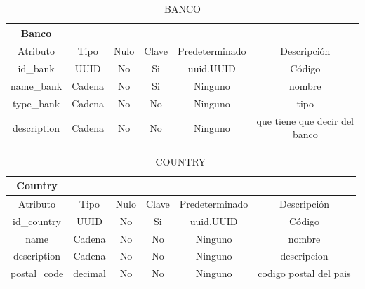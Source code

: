 \documentclass{article}
\begin{document}
\begin{table}[H]
    \centering
    \begin{tabular}{|c|c|c|c|c|c|}
    \hline
Banco	& & & & & \\		
\hline
Atributo&	Tipo&	Nulo&	Clave&	Predeterminado&	Descripción\\
\hline

id_bank&	UUID&	No&	Si&	uuid.UUID&	Código\\
\hline

name_bank&	Cadena&	No&	Si	&Ninguno	&nombre\\
\hline

type_bank	&Cadena&	No	&No	&Ninguno&	tipo\\
\hline

description&	Cadena	&No	&No&	Ninguno&	que tiene que decir del banco\\
\hline
    \end{tabular}
    \caption{BANCO}
    \label{}
\end{table}

\begin{table}[H]
    \centering
    \begin{tabular}{|c|c|c|c|c|c|}
    \hline
Country	& & & & & \\	
\hline

Atributo	&Tipo&	Nulo&	Clave&	Predeterminado&	Descripción\\
\hline

id_country&	UUID&	No	&Si	&uuid.UUID	&Código\\
\hline

name&	Cadena&	No&	No&	Ninguno&	nombre\\
\hline

description	&Cadena&	No	&No	&Ninguno	&descripcion\\
\hline

postal_code	&decimal	&No	&No	&Ninguno	&codigo postal del pais\\
\hline
    \end{tabular}
    \caption{COUNTRY}
    \label{}
\end{table}
\end{document}
